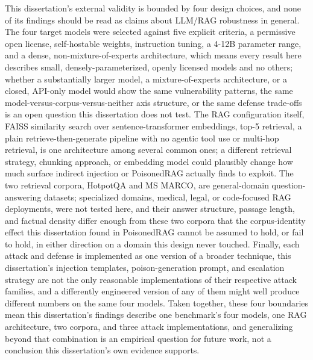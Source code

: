 This dissertation's external validity is bounded by four design
choices, and none of its findings should be read as claims about
LLM/RAG robustness in general. The four target models were selected
against five explicit criteria, a permissive open license, self-hostable
weights, instruction tuning, a 4-12B parameter range, and a dense,
non-mixture-of-experts architecture, which means every result here
describes small, densely-parameterized, openly licensed models and no
others; whether a substantially larger model, a mixture-of-experts
architecture, or a closed, API-only model would show the same
vulnerability patterns, the same model-versus-corpus-versus-neither
axis structure, or the same defense trade-offs is an open question this
dissertation does not test. The RAG configuration itself,
FAISS similarity search over sentence-transformer embeddings, top-5
retrieval, a plain retrieve-then-generate pipeline with no agentic tool
use or multi-hop retrieval, is one architecture among several common
ones; a different retrieval strategy, chunking approach, or embedding
model could plausibly change how much surface indirect injection or
PoisonedRAG actually finds to exploit. The two retrieval corpora,
HotpotQA and MS MARCO, are general-domain question-answering datasets;
specialized domains, medical, legal, or code-focused RAG deployments,
were not tested here, and their answer structure, passage length, and
factual density differ enough from these two corpora that the
corpus-identity effect this dissertation found in PoisonedRAG cannot be
assumed to hold, or fail to hold, in either direction on a domain this
design never touched. Finally, each attack and defense is implemented
as one version of a broader technique, this dissertation's injection
templates, poison-generation prompt, and escalation strategy are not the
only reasonable implementations of their respective attack families, and
a differently engineered version of any of them might well produce
different numbers on the same four models. Taken together, these four
boundaries mean this dissertation's findings describe one benchmark's
four models, one RAG architecture, two corpora, and three attack
implementations, and generalizing beyond that combination is an
empirical question for future work, not a conclusion this
dissertation's own evidence supports.

